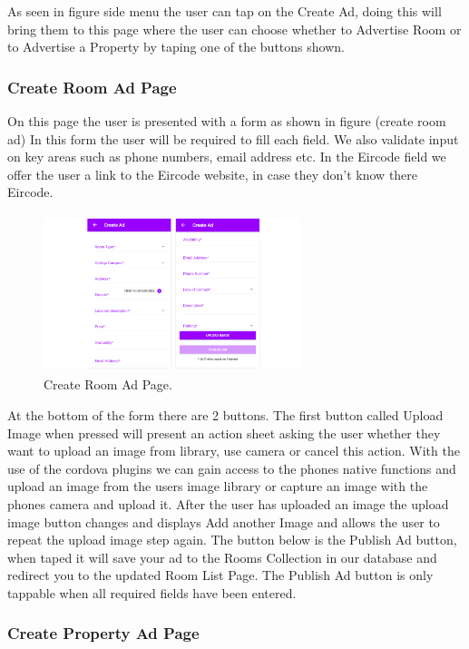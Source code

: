 As seen in figure side menu the user can tap on the Create Ad, doing this will bring them to this page where the user can choose whether to Advertise Room or to Advertise a Property by taping one of the buttons shown.

\subsubsection{Create Room Ad Page}

On this page the user is presented with a form as shown in figure (create room ad) In this form the user will be required to fill each field. We also validate input on key areas such as phone numbers, email address etc. In the Eircode field we offer the user a link to the Eircode website, in case they don’t know there Eircode. 

\begin{figure}[h]
\centering
\includegraphics[width=7.5cm, height=4.6cm]{img/createRoom}
\caption{Create Room Ad Page.}
\end{figure}

At the bottom of the form there are 2 buttons. The first button called Upload Image when pressed will present an action sheet asking the user whether they want to upload an image from library, use camera or cancel this action. With the use of the cordova plugins we can gain access to the phones native functions and upload an image from the users image library or capture an image with the phones camera and upload it. After the user has uploaded an image the upload image button changes and displays Add another Image and allows the user to repeat the upload image step again. The button below is the Publish Ad button, when taped it will save your ad to the Rooms Collection in our database and redirect you to the updated Room List Page. The Publish Ad button is only tappable when all required fields have been entered.

\subsubsection{Create Property Ad Page}

